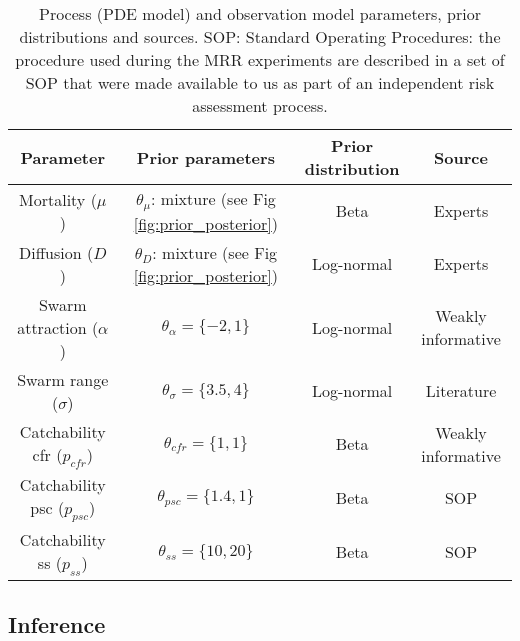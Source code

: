 \documentclass[]{bmcart}
\begin{document}
\begin{table}[h]
\centering
\begingroup\small
\begin{tabular}{|c|ccc|}
\hline
Parameter & Prior parameters & Prior distribution & Source \\\hline
Mortality ($\mu$) & $ \theta_\mu$: mixture (see Fig \ref{fig:prior_posterior}) & Beta & Experts\\
Diffusion ($D$) & $\theta_D$: mixture (see Fig \ref{fig:prior_posterior}) & Log-normal & Experts\\
Swarm attraction ($\alpha$) & $\theta_\alpha = \{ -2, 1 \}$ & Log-normal &  Weakly informative \\ 
Swarm range ($\sigma$) &  $\theta_\sigma = \{3.5, 4 \}$ & Log-normal &  Literature\\ 
Catchability cfr ($p_{cfr}$) & $\theta_{cfr} =\{1, 1\}$ & Beta & Weakly informative \\ 
Catchability psc ($p_{psc}$) & $\theta_{psc} =\{1.4, 1\}$ & Beta & SOP \\ 
Catchability ss ($p_{ss}$) & $\theta_{ss} =\{10, 20\}$ & Beta & SOP \\
\hline
\end{tabular}
\endgroup
\caption{\label{tble:prior} Process (PDE model) and observation model parameters, prior distributions and sources. SOP: Standard Operating Procedures: the procedure used during the MRR experiments are described in a set of SOP that were made available to us as part of an independent risk assessment process.}
\end{table}

\subsection{Inference}
\end{document}
